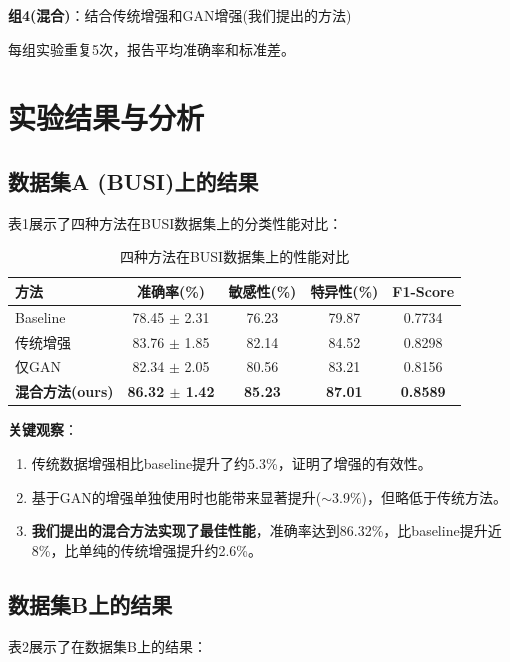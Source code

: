 \documentclass[supercite]{../Hust-undergraduate-translation/Experimental_Report}
\theoremstyle{definition}
\begin{document}
\textbf{组4(混合)}：结合传统增强和GAN增强(我们提出的方法)

每组实验重复5次，报告平均准确率和标准差。

\section{实验结果与分析}

\subsection{数据集A (BUSI)上的结果}

表1展示了四种方法在BUSI数据集上的分类性能对比：

\begin{table}[htbp]
\centering
\caption{四种方法在BUSI数据集上的性能对比}
\label{tbl:result_busi}
\begin{tabular}{|l|c|c|c|c|}
\hline
方法 & 准确率(\%) & 敏感性(\%) & 特异性(\%) & F1-Score \\
\hline
Baseline & 78.45 $\pm$ 2.31 & 76.23 & 79.87 & 0.7734 \\
\hline
传统增强 & 83.76 $\pm$ 1.85 & 82.14 & 84.52 & 0.8298 \\
\hline
仅GAN & 82.34 $\pm$ 2.05 & 80.56 & 83.21 & 0.8156 \\
\hline
\textbf{混合方法(ours)} & \textbf{86.32 $\pm$ 1.42} & \textbf{85.23} & \textbf{87.01} & \textbf{0.8589} \\
\hline
\end{tabular}
\end{table}

\textbf{关键观察}：
\begin{enumerate}
\item 传统数据增强相比baseline提升了约5.3\%，证明了增强的有效性。
\item 基于GAN的增强单独使用时也能带来显著提升($\sim$3.9\%)，但略低于传统方法。
\item \textbf{我们提出的混合方法实现了最佳性能}，准确率达到86.32\%，比baseline提升近8\%，比单纯的传统增强提升约2.6\%。
\end{enumerate}

\subsection{数据集B上的结果}

表2展示了在数据集B上的结果：
\end{document}
